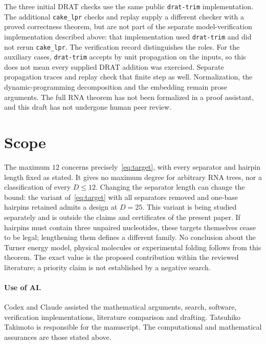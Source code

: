 \documentclass[11pt,a4paper]{article}
\theoremstyle{definition}
\begin{document}
The three initial DRAT checks use the same public \texttt{drat-trim}
implementation. The additional \texttt{cake\_lpr} checks and replay
supply a different checker with a proved correctness theorem, but are
not part of the separate model-verification implementation described
above: that implementation used \texttt{drat-trim} and did not rerun
\texttt{cake\_lpr}. The verification record distinguishes the roles.
For the auxiliary cases, \texttt{drat-trim} accepts by unit propagation
on the inputs, so this does not mean every supplied DRAT addition was
exercised. Separate propagation traces and replay check that finite
step as well. Normalization, the dynamic-programming decomposition and
the embedding remain prose arguments. The full RNA theorem has not
been formalized in a proof assistant, and this draft has not undergone
human peer review.

\section{Scope}
The maximum $12$ concerns precisely~\eqref{eq:target}, with every
separator and hairpin length fixed as stated. It gives no maximum
degree for arbitrary RNA trees, nor a classification of every
$D\leq12$. Changing the separator length can change the bound: the
variant of~\eqref{eq:target} with all separators removed and one-base
hairpins retained admits a design at $D=25$. This variant is being
studied separately and is outside the claims and certificates of the
present paper. If hairpins must contain three unpaired nucleotides, these
targets themselves cease to be legal; lengthening them defines a
different family. No conclusion about the Turner energy model,
physical molecules or experimental folding follows from this theorem.
The exact value is the proposed contribution within the reviewed
literature; a priority claim is not established by a negative search.

\paragraph{Use of AI.}
Codex and Claude assisted the mathematical arguments, search, software,
verification implementations, literature comparison and drafting.
Tatsuhiko Takimoto is responsible for the manuscript. The computational
and mathematical assurances are those stated above.
\end{document}
